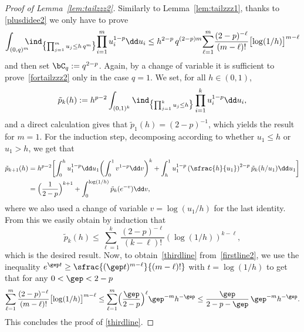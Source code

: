 \begin{proof}[Proof of Lemma~\ref{lem:tailzzz2}]
Similarly to Lemma~\ref{lem:tailzzz1},
thanks to \eqref{plusdidee2} we only have to prove
\begin{equation}
\label{fortailzzz2}
\int_{(0,q)^m}\hspace*{-2.5mm} \ind_{\bigl\{\prod^m_{j=1}u_j \le h\, q^m\bigr\}}\! \prod_{i=1}^m u^{1-p}_i \dd u_i \le h^{2-p} \, q^{(2-p)m}\!\sum_{\ell=1}^{m}\!\frac{(2-p)^{-\ell}}{(m-\ell)!} \bigl[\log (1/h)\bigr]^{m-\ell}
\end{equation}
and then set $\bC_q := q^{2-p}$.
Again, by a change of variable it is sufficient to prove~\eqref{fortailzzz2} only in the case $q=1$.
We set, for all $h\in (0,1)$,
\begin{equation*}
\tilde p_k(h):= h^{p-2}\int_{(0,1)^k}
\ind_{\bigl\{\prod^k_{j=1}u_j \le h\bigr\}} \prod_{i=1}^k u^{1-p}_i \dd u_i,
\end{equation*}
and a direct calculation gives that $\tilde p_1(h)=(2-p)^{-1}$,
which yields the result for $m=1$.
For the induction step, decomposing according to whether $u_1 \leq h$ or $u_1>h$, we get that
\begin{align*}
\tilde p_{k+1}(h) &= h^{p-2} \biggl[ \int^{h}_0 u_1^{1-p}\dd u_1 \biggl(\int_{0}^1 v^{1-p}\dd v\biggr)^k + \int^1_{h} u_1^{1-p}\left(\sfrac{h}{u_1} \right)^{2-p} \tilde p_k(h/u_1) \dd u_1 \biggr] \\
& = \Bigl(\frac{1}{2-p}\Bigr)^{k+1}+ \int_0^{\log(1/h)} \tilde p_k(e^{-v}) \dd v,
\end{align*}
where we also used a change of variable $v=\log(u_1/h)$ for the last identity.
From this we easily obtain by induction
that
\begin{equation*}
\tilde p_k(h) \le \sum_{\ell=1}^{k} \frac{(2-p)^{-\ell}}{(k-\ell)!} (\log (1/h))^{k-\ell},
\end{equation*}
which is the desired result.
Now, to obtain~\eqref{thirdline} from~\eqref{firstline2}, we use the inequality $e^{\gep t} \geq \sfrac{(\gep t)^{m-\ell}}{(m-\ell)!}$ with $t=\log (1/h)$ to get that for any $0<\gep<2-p$
\begin{equation}
\sum_{\ell=1}^{m}\frac{(2-p)^{-\ell}}{(m-\ell)!} \bigl[\log (1/h)\bigr]^{m-\ell} \le \sum_{\ell=1}^{ m} \Bigl(\frac{\gep}{2-p}\Bigr)^{\ell} \gep^{ -m} h^{-\gep} \le \frac{\gep}{ 2-p-\gep}\, \gep^{ -m} h^{-\gep}.
\end{equation}
This concludes the proof of \eqref{thirdline}.
\end{proof}

